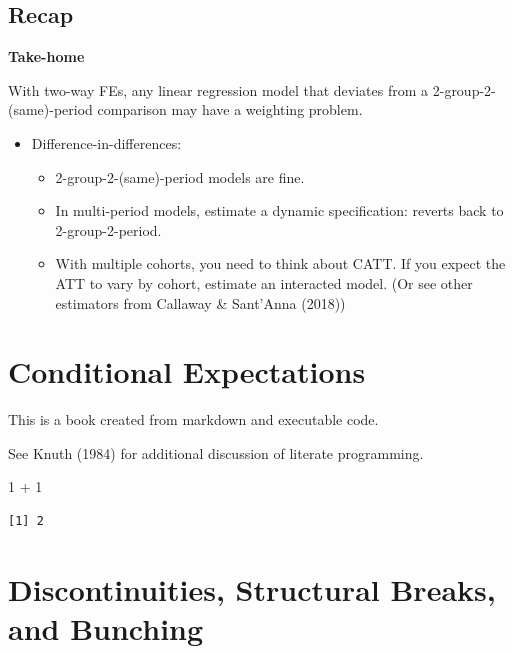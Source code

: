 \documentclass[
  letterpaper,
  DIV=11,
  numbers=noendperiod]{scrreprt}
\newenvironment{Shaded}{\begin{snugshade}}{\end{snugshade}}
\newcommand{\DecValTok}[1]{\textcolor[rgb]{0.68,0.00,0.00}{#1}}
\newcommand{\SpecialCharTok}[1]{\textcolor[rgb]{0.37,0.37,0.37}{#1}}
\providecommand{\tightlist}{%
  \setlength{\itemsep}{0pt}\setlength{\parskip}{0pt}}\usepackage{longtable,booktabs,array}
\theoremstyle{definition}
\theoremstyle{remark}
\begin{document}
\hypertarget{recap}{%
\section{Recap}\label{recap}}

\textbf{Take-home}

With two-way FEs, any linear regression model that deviates from a
2-group-2-(same)-period comparison may have a weighting problem.

\begin{itemize}
\tightlist
\item
  Difference-in-differences:

  \begin{itemize}
  \tightlist
  \item
    2-group-2-(same)-period models are fine.
  \item
    In multi-period models, estimate a dynamic specification: reverts
    back to 2-group-2-period.
  \item
    With multiple cohorts, you need to think about CATT. If you expect
    the ATT to vary by cohort, estimate an interacted model. (Or see
    other estimators from Callaway \& Sant'Anna (2018))
  \end{itemize}
\end{itemize}

\hypertarget{conditional-expectations-1}{%
\chapter{Conditional Expectations}\label{conditional-expectations-1}}

This is a book created from markdown and executable code.

See Knuth (1984) for additional discussion of literate programming.

\begin{Shaded}
\begin{Highlighting}[]
\DecValTok{1} \SpecialCharTok{+} \DecValTok{1}
\end{Highlighting}
\end{Shaded}

\begin{verbatim}
[1] 2
\end{verbatim}

\hypertarget{discontinuities-structural-breaks-and-bunching}{%
\chapter{Discontinuities, Structural Breaks, and
Bunching}\label{discontinuities-structural-breaks-and-bunching}}
\end{document}

